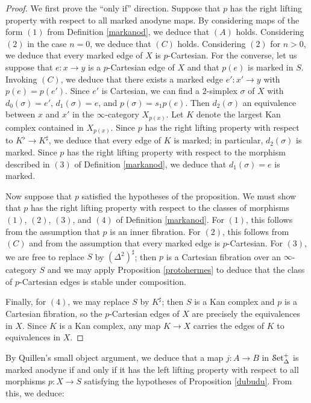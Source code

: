 \begin{proof}
We first prove the ``only if'' direction. Suppose that $p$ has the right lifting property with respect to all marked anodyne maps. By considering maps of the form $(1)$ from Definition \ref{markanod}, we deduce that $(A)$ holds. Considering $(2)$ in the case $n=0$, we deduce that $(C)$ holds. Considering $(2)$ for $n > 0$, we deduce that every marked edge of $X$ is $p$-Cartesian.
For the converse, let us suppose that $e: x \rightarrow y$ is a $p$-Cartesian edge of $X$ and that $p(e)$ is marked in $S$. Invoking $(C)$, we deduce that there exists a marked edge $e': x' \rightarrow y$ with $p(e)=p(e')$. Since $e'$ is Cartesian,
we can find a $2$-simplex $\sigma$ of $X$ with $d_0(\sigma) = e'$, $d_1(\sigma)=e$, and 
$p(\sigma)= s_1 p(e)$. Then
$d_2(\sigma)$ an equivalence between $x$ and $x'$ in the $\infty$-category $X_{p(x)}$. Let $K$ denote the largest Kan complex contained in $X_{p(x)}$. Since $p$ has the right lifting property with respect to
$K^{\flat} \rightarrow K^{\sharp}$, we deduce that every edge of $K$ is marked; in particular, $d_2(\sigma)$ is marked. Since $p$ has the right lifting property with respect to the morphism described in $(3)$ of Definition \ref{markanod}, we deduce that $d_1(\sigma)=e$ is marked.

Now suppose that $p$ satisfied the hypotheses of the proposition. We must show that $p$ has the right lifting property with respect to the classes of morphisms $(1)$, $(2)$, $(3)$, and $(4)$ of Definition \ref{markanod}. For $(1)$, this follows from the assumption that $p$ is an inner fibration. 
For $(2)$, this follows from $(C)$ and from the assumption that every marked edge is $p$-Cartesian. For $(3)$, we are free to replace $S$ by $(\Delta^2)^{\sharp}$; then $p$ is a Cartesian fibration over an $\infty$-category $S$ and we may apply Proposition \ref{protohermes} to deduce that the class of $p$-Cartesian edges is stable under composition.

Finally, for $(4)$, we may replace $S$ by $K^{\sharp}$; 
then $S$ is a Kan complex and $p$ is a Cartesian fibration, so the $p$-Cartesian edges of $X$
are precisely the equivalences in $X$. Since $K$ is a Kan complex, any
map $K \rightarrow X$ carries the edges of $K$ to equivalences in $X$.
\end{proof}

By Quillen's small object argument, we 
deduce that a map $j: A \rightarrow B$ in $\operatorname{\mathcal{S}et_{\Delta}^{+}}$ is marked anodyne if and only if it has the left lifting property with respect to all morphisms $p: X \rightarrow S$ satisfying the hypotheses of Proposition \ref{dubudu}. From this, we deduce:

